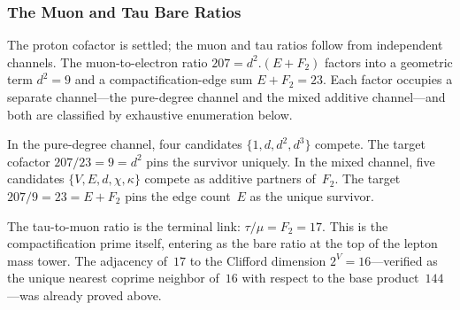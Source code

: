 \documentclass[11pt,a4paper]{book}
\def\cdot{.}%
\begin{document}

\subsubsection*{The Muon and Tau Bare Ratios}

The proton cofactor is settled; the muon and tau ratios follow from
independent channels.  The muon-to-electron ratio $207 = d^2 \cdot (E + F_2)$
factors into a geometric term $d^2 = 9$ and a compactification-edge
sum $E + F_2 = 23$.  Each factor occupies a separate channel---the
pure-degree channel and the mixed additive channel---and both are
classified by exhaustive enumeration below.

In the pure-degree channel, four candidates $\{1, d, d^2, d^3\}$
compete.  The target cofactor $207/23 = 9 = d^2$ pins the survivor
uniquely.  In the mixed channel, five candidates
$\{V, E, d, \chi, \kappa\}$ compete as additive partners of~$F_2$.
The target $207/9 = 23 = E + F_2$ pins the edge count~$E$ as
the unique survivor.

The tau-to-muon ratio is the terminal link: $\tau/\mu = F_2 = 17$.
This is the compactification prime itself, entering as the bare ratio
at the top of the lepton mass tower.  The adjacency of~$17$ to the
Clifford dimension $2^V = 16$---verified as the unique nearest
coprime neighbor of~$16$ with respect to the base product~$144$---was
already proved above.
\end{document}
